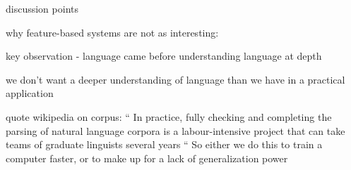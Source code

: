 discussion points 

why feature-based systems are not as interesting:

key observation - language came before understanding language at depth

we don't want a deeper understanding of language than we have in a practical application


quote wikipedia on corpus:
``
In practice, fully checking and completing the parsing of natural language corpora is a 
labour-intensive project that can take teams of graduate linguists several years
``
So either we do this to train a computer faster, or to make up for a lack of 
generalization power

